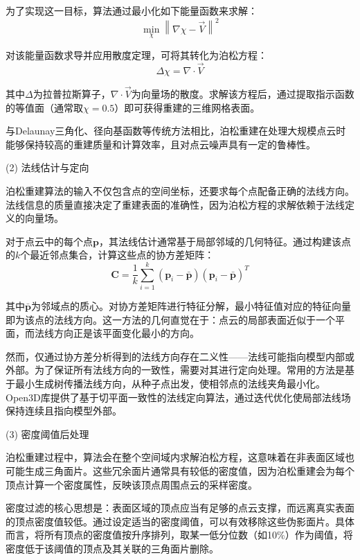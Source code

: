 为了实现这一目标，算法通过最小化如下能量函数来求解：
\begin{equation}
\min_{\chi} \left\| \nabla\chi - \vec{V} \right\|^2
\end{equation}

对该能量函数求导并应用散度定理，可将其转化为泊松方程：
\begin{equation}
\Delta\chi = \nabla \cdot \vec{V}
\end{equation}

其中$\Delta$为拉普拉斯算子，$\nabla \cdot \vec{V}$为向量场的散度。求解该方程后，通过提取指示函数的等值面（通常取$\chi = 0.5$）即可获得重建的三维网格表面。

与Delaunay三角化、径向基函数等传统方法相比，泊松重建在处理大规模点云时能够保持较高的重建质量和计算效率，且对点云噪声具有一定的鲁棒性\cite{kazhdan2006poisson}。

(2) 法线估计与定向

泊松重建算法的输入不仅包含点的空间坐标，还要求每个点配备正确的法线方向。法线信息的质量直接决定了重建表面的准确性，因为泊松方程的求解依赖于法线定义的向量场。

对于点云中的每个点$\mathbf{p}$，其法线估计通常基于局部邻域的几何特征。通过构建该点的$k$个最近邻点集合，计算这些点的协方差矩阵：
\begin{equation}
\mathbf{C} = \frac{1}{k}\sum_{i=1}^{k}(\mathbf{p}_i - \bar{\mathbf{p}})(\mathbf{p}_i - \bar{\mathbf{p}})^T
\end{equation}

其中$\bar{\mathbf{p}}$为邻域点的质心。对协方差矩阵进行特征分解，最小特征值对应的特征向量即为该点的法线方向。这一方法的几何直觉在于：点云的局部表面近似于一个平面，而法线方向正是该平面变化最小的方向。

然而，仅通过协方差分析得到的法线方向存在二义性——法线可能指向模型内部或外部。为了保证所有法线方向的一致性，需要对其进行定向处理。常用的方法是基于最小生成树传播法线方向，从种子点出发，使相邻点的法线夹角最小化。Open3D库提供了基于切平面一致性的法线定向算法，通过迭代优化使局部法线场保持连续且指向模型外部\cite{zhou2018open3d}。

(3) 密度阈值后处理

泊松重建过程中，算法会在整个空间域内求解泊松方程，这意味着在非表面区域也可能生成三角面片。这些冗余面片通常具有较低的密度值，因为泊松重建会为每个顶点计算一个密度属性，反映该顶点周围点云的采样密度。

密度过滤的核心思想是：表面区域的顶点应当有足够的点云支撑，而远离真实表面的顶点密度值较低。通过设定适当的密度阈值，可以有效移除这些伪影面片。具体而言，将所有顶点的密度值按升序排列，取某一低分位数（如10\%）作为阈值，将密度低于该阈值的顶点及其关联的三角面片删除。

